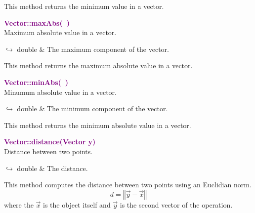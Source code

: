 This method returns the minimum value in a vector.

\textcolor{purple}{\textbf{Vector::maxAbs(~)}}\label{Vector::maxAbs()}\\
Maximum absolute value in a vector.\vspace*{-0.5em}
\begin{tcolorbox}[grow to left by=-1cm, width=\textwidth-1cm,myArgs,tabularx={l|R}]
$\hookrightarrow$ double & The maximum component of the vector.
\end{tcolorbox}

This method returns the maximum absolute value in a vector.

\textcolor{purple}{\textbf{Vector::minAbs(~)}}\label{Vector::minAbs()}\\
Minumum absolute value in a vector.\vspace*{-0.5em}
\begin{tcolorbox}[grow to left by=-1cm, width=\textwidth-1cm,myArgs,tabularx={l|R}]
$\hookrightarrow$ double & The minimum component of the vector.
\end{tcolorbox}

This method returns the minimum absolute value in a vector.

\textcolor{purple}{\textbf{Vector::distance(Vector y)}}\label{Vector::distance(Vector y)}\\
Distance between two points.\vspace*{-0.5em}
\begin{tcolorbox}[grow to left by=-1cm, width=\textwidth-1cm,myArgs,tabularx={l|R}]
$\hookrightarrow$ double & The distance.
\end{tcolorbox}

This method computes the distance between two points using an Euclidian norm.
\begin{equation*}
d = \left\Vert \overrightarrow{y} - \overrightarrow{x} \right\Vert
\end{equation*}
where the $\overrightarrow{x}$ is the object itself and $\overrightarrow{y}$ is the second vector of the operation.

